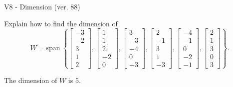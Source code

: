 \begin{exercise}
  \begin{exerciseTitle}V8 - Dimension (ver. 88)\end{exerciseTitle}
  \begin{exerciseStatement}
    Explain how to find the dimension of 
\[W=\mathrm{span}\ \left\{\left[\begin{array}{r}
-3 \\
-2 \\
3 \\
1 \\
2
\end{array}\right] , \left[\begin{array}{r}
1 \\
1 \\
2 \\
-2 \\
0
\end{array}\right] , \left[\begin{array}{r}
3 \\
-3 \\
-4 \\
0 \\
-3
\end{array}\right] , \left[\begin{array}{r}
2 \\
-1 \\
3 \\
1 \\
-3
\end{array}\right] , \left[\begin{array}{r}
-4 \\
-1 \\
0 \\
-2 \\
-1
\end{array}\right] , \left[\begin{array}{r}
2 \\
1 \\
3 \\
0 \\
3
\end{array}\right]\right\}.\]



  \end{exerciseStatement}
  \begin{exerciseAnswer}
   The dimension of \(W\) is  \(5\).
  


  \end{exerciseAnswer}
\end{exercise}
